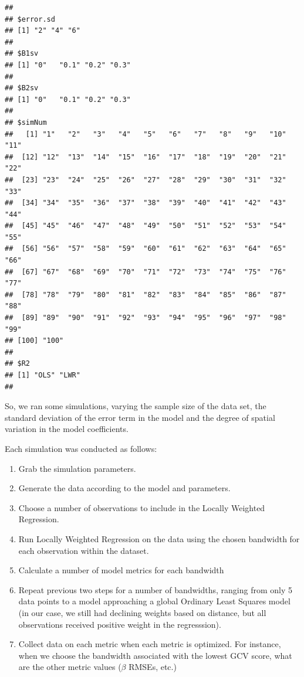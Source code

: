 \documentclass{article}
\makeatletter
\newenvironment{kframe}{%
 \def\FrameCommand##1{\hskip\@totalleftmargin \hskip-\fboxsep
 \colorbox{shadecolor}{##1}\hskip-\fboxsep
     \hskip-\linewidth \hskip-\@totalleftmargin \hskip\columnwidth}%
 \MakeFramed {\advance\hsize-\width
   \@totalleftmargin\z@ \linewidth\hsize
   \@setminipage}}%
 {\par\unskip\endMakeFramed}
\newenvironment{knitrout}{}{} %
\makeatother
\begin{document}
\begin{knitrout}
\begin{kframe}
\begin{verbatim}
## 
## $error.sd
## [1] "2" "4" "6"
## 
## $B1sv
## [1] "0"   "0.1" "0.2" "0.3"
## 
## $B2sv
## [1] "0"   "0.1" "0.2" "0.3"
## 
## $simNum
##   [1] "1"   "2"   "3"   "4"   "5"   "6"   "7"   "8"   "9"   "10"  "11" 
##  [12] "12"  "13"  "14"  "15"  "16"  "17"  "18"  "19"  "20"  "21"  "22" 
##  [23] "23"  "24"  "25"  "26"  "27"  "28"  "29"  "30"  "31"  "32"  "33" 
##  [34] "34"  "35"  "36"  "37"  "38"  "39"  "40"  "41"  "42"  "43"  "44" 
##  [45] "45"  "46"  "47"  "48"  "49"  "50"  "51"  "52"  "53"  "54"  "55" 
##  [56] "56"  "57"  "58"  "59"  "60"  "61"  "62"  "63"  "64"  "65"  "66" 
##  [67] "67"  "68"  "69"  "70"  "71"  "72"  "73"  "74"  "75"  "76"  "77" 
##  [78] "78"  "79"  "80"  "81"  "82"  "83"  "84"  "85"  "86"  "87"  "88" 
##  [89] "89"  "90"  "91"  "92"  "93"  "94"  "95"  "96"  "97"  "98"  "99" 
## [100] "100"
## 
## $R2
## [1] "OLS" "LWR"
## 
\end{verbatim}
\end{kframe}
\end{knitrout}


So, we ran some simulations, varying the sample size of the data set, the standard deviation of the error term in the model and the degree of spatial variation in the model coefficients. 

Each simulation was conducted as follows:
\begin{enumerate}
\item Grab the simulation parameters.
\item Generate the data according to the model and parameters. 
\item Choose a number of observations to include in the Locally Weighted Regression.
\item Run Locally Weighted Regression on the data using the chosen bandwidth for each observation within the dataset.
\item Calculate a number of model metrics for each bandwidth
\item Repeat previous two steps for a number of bandwidths, ranging from only 5 data points to a model approaching a global Ordinary Least Squares model (in our case, we still had declining weights based on distance, but all observations received positive weight in the regresssion).
\item Collect data on each metric when each metric is optimized. For instance, when we choose the bandwidth associated with the lowest GCV score, what are the other metric values ($\beta$ RMSEs, etc.)
\end{enumerate}
\end{document}
